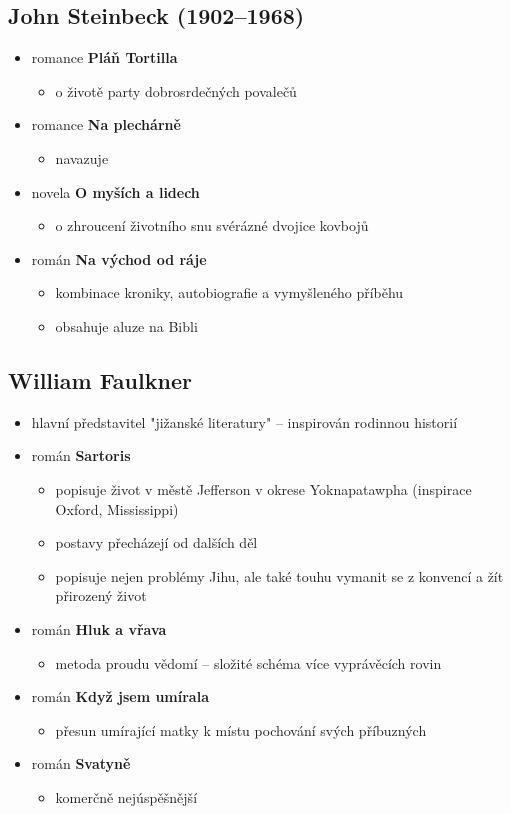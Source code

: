 \subsection{John Steinbeck (1902--1968)}
\begin{itemize}
\item romance \textbf{Pláň Tortilla}
	\begin{itemize}
	\item o životě party dobrosrdečných povalečů
	\end{itemize}
\item romance \textbf{Na plechárně}
	\begin{itemize}
	\item navazuje
	\end{itemize}
\item novela \textbf{O myších a lidech}
	\begin{itemize}
	\item o zhroucení životního snu svérázné dvojice kovbojů
	\end{itemize}
\item román \textbf{Na východ od ráje}
	\begin{itemize}
	\item kombinace kroniky, autobiografie a vymyšleného příběhu
	\item obsahuje aluze na Bibli
	\end{itemize}
\end{itemize}

\subsection{William Faulkner}
\begin{itemize}
\item hlavní představitel "jižanské literatury" -- inspirován rodinnou historií
\item román \textbf{Sartoris}
	\begin{itemize}
	\item popisuje život v městě Jefferson v okrese Yoknapatawpha (inspirace Oxford, Mississippi)
	\item postavy přecházejí od dalších děl
	\item popisuje nejen problémy Jihu, ale také touhu vymanit se z konvencí a žít přirozený život
	\end{itemize}
\item román \textbf{Hluk a vřava}
	\begin{itemize}
	\item metoda proudu vědomí -- složité schéma více vyprávěcích rovin
	\end{itemize}
\item román \textbf{Když jsem umírala}
	\begin{itemize}
	\item přesun umírající matky k místu pochování svých příbuzných
	\end{itemize}
\item román \textbf{Svatyně}
	\begin{itemize}
	\item komerčně nejúspěšnější
	\end{itemize}
\end{itemize}


